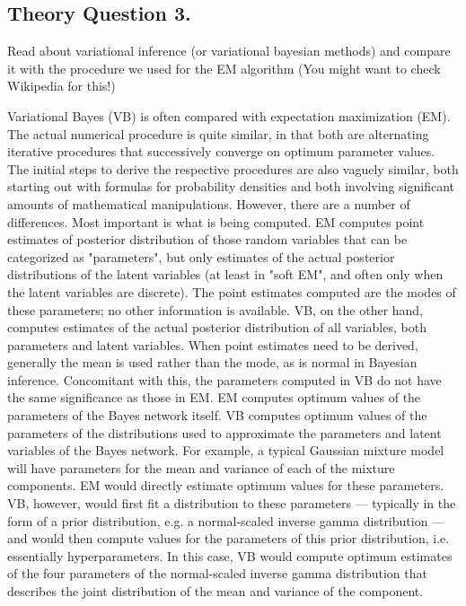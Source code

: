 \documentclass[12pt]{article}
\begin{document}
\subsection{Theory Question 3.}
Read about variational inference (or variational bayesian methods) and compare it with the procedure we used for the EM algorithm (You might want to check Wikipedia for this!)
\begin{qsolve}[solution]
    Variational Bayes (VB) is often compared with expectation maximization (EM). The actual numerical procedure is quite similar, in that both are alternating iterative procedures that successively converge on optimum parameter values. The initial steps to derive the respective procedures are also vaguely similar, both starting out with formulas for probability densities and both involving significant amounts of mathematical manipulations. However, there are a number of differences. Most important is what is being computed. EM computes point estimates of posterior distribution of those random variables that can be categorized as "parameters", but only estimates of the actual posterior distributions of the latent variables (at least in "soft EM", and often only when the latent variables are discrete). The point estimates computed are the modes of these parameters; no other information is available. VB, on the other hand, computes estimates of the actual posterior distribution of all variables, both parameters and latent variables. When point estimates need to be derived, generally the mean is used rather than the mode, as is normal in Bayesian inference. Concomitant with this, the parameters computed in VB do not have the same significance as those in EM. EM computes optimum values of the parameters of the Bayes network itself. VB computes optimum values of the parameters of the distributions used to approximate the parameters and latent variables of the Bayes network. For example, a typical Gaussian mixture model will have parameters for the mean and variance of each of the mixture components. EM would directly estimate optimum values for these parameters. VB, however, would first fit a distribution to these parameters — typically in the form of a prior distribution, e.g. a normal-scaled inverse gamma distribution — and would then compute values for the parameters of this prior distribution, i.e. essentially hyperparameters. In this case, VB would compute optimum estimates of the four parameters of the normal-scaled inverse gamma distribution that describes the joint distribution of the mean and variance of the component.
\end{qsolve}
\clearpage
\end{document}

